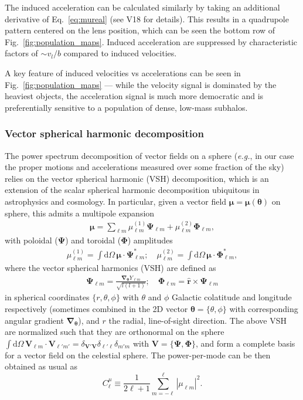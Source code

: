 \documentclass[twocolumn]{aastex63}
\newcommand{\vect}[1]{\boldsymbol{\mathbf{#1}}}
\newcommand{\dd}{\mathrm{d}}
\begin{document}
The induced acceleration can be calculated similarly by taking an additional derivative of Eq.~\ref{eq:mureal} (see V18 for details). This results in a quadrupole pattern centered on the lens position, which can be seen the bottom row of Fig.~\ref{fig:population_maps}. Induced acceleration are suppressed by characteristic factors of $\sim v_l/b$ compared to induced velocities. 

A key feature of induced velocities vs accelerations can be seen in Fig.~\ref{fig:population_maps} --- while the velocity signal is dominated by the heaviest objects, the acceleration signal is much more democratic and is preferentially sensitive to a population of dense, low-mass subhalos.

\subsubsection*{Vector spherical harmonic decomposition}

The power spectrum decomposition of vector fields on a sphere (\emph{e.g.}, in our case the proper motions and accelerations measured over some fraction of the sky) relies on the vector spherical harmonic (VSH) decomposition, which is an extension of the scalar spherical harmonic decomposition ubiquitous in astrophysics and cosmology. In particular, given a vector field $\vect \mu = \vect \mu(\vect \theta)$ on sphere, this admits a multipole expansion
\begin{align}
\vect{\mu} = \sum_{\ell m} \mu^{(1)}_{\ell m} \vect{\Psi}_{\ell m} + \mu^{(2)}_{\ell m} \vect{\Phi}_{\ell m},
\label{eq:vsh_decomposition}
\end{align}
with poloidal ($\vect{\Psi}$) and toroidal ($\vect{\Phi}$) amplitudes 
\begin{align}
\mu^{(1)}_{\ell m} =  \int \dd \Omega \, \vect{\mu} \cdot \vect{\Psi}^*_{\ell m};\quad
 \mu^{(2)}_{\ell m} =  \int \dd \Omega \, \vect{\mu} \cdot \vect{\Phi}^*_{\ell m},
 \label{eq:harmdecomposition}
\end{align}
where the vector spherical harmonics (VSH) are defined as
\begin{align}
\vect{\Psi}_{\ell m} = \frac{\vect{\nabla}_{\vect{\theta}} Y_{\ell m}}{\sqrt{l(l+1)}}; \quad \vect{\Phi}_{\ell m} = \hat{\vect{r}} \times 
\vect{\Psi}_{\ell m} \label{eq:PsiPhidef}
\end{align}
in spherical coordinates $\lbrace r, \theta, \phi \rbrace$ with $\theta$ and $\phi$ Galactic colatitude and longitude respectively (sometimes combined in the 2D vector $\vect{\theta} = \lbrace \theta, \phi \rbrace$ with corresponding angular gradient $\vect{\nabla}_{\vect{\theta}}$), and $r$ the radial, line-of-sight direction. The above VSH are normalized such that they are orthonormal on the sphere $\int \dd \Omega \, \vect{V}_{\ell m} \cdot \vect{V}_{\ell' m'}  = \delta_{\vect{V}'\vect{V}} \delta_{\ell' \ell} \delta_{m' m}$ with $\vect{V} = \{\vect{\Psi},\vect{\Phi}\}$, and form a complete basis for a vector field on the celestial sphere. The power-per-mode can be then obtained as usual as 
\begin{equation}
C_{\ell}^{\mu} \equiv \frac{1}{2\ell + 1} \sum_{m = -\ell}^{\ell} \left| \mu_{\ell m} \right|^2.
\end{equation}
\end{document}
